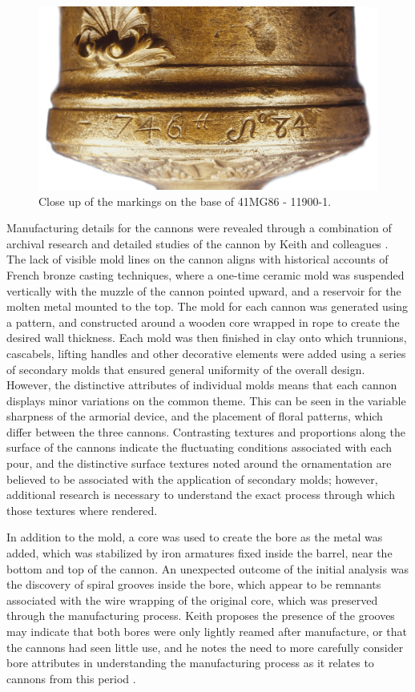 \documentclass[review]{elsarticle}
\begin{document}
\begin{figure}[ht]\centering
\includegraphics[width=\linewidth]{FigBASE2}
\caption{Close up of the markings on the base of 41MG86 - 11900-1.}
\label{fig:FigBASE}
\end{figure}

Manufacturing details for the cannons were revealed through a combination of archival research and detailed studies of the cannon by Keith and colleagues \citep[359-367]{RN5763}. The lack of visible mold lines on the cannon aligns with historical accounts of French bronze casting techniques, where a one-time ceramic mold was suspended vertically with the muzzle of the cannon pointed upward, and a reservoir for the molten metal mounted to the top. The mold for each cannon was generated using a pattern, and constructed around a wooden core wrapped in rope to create the desired wall thickness. Each mold was then finished in clay onto which trunnions, cascabels, lifting handles and other decorative elements were added using a series of secondary molds that ensured general uniformity of the overall design. However, the distinctive attributes of individual molds means that each cannon displays minor variations on the common theme. This can be seen in the variable sharpness of the armorial device, and the placement of floral patterns, which differ between the three cannons. Contrasting textures and proportions along the surface of the cannons indicate the fluctuating conditions associated with each pour, and the distinctive surface textures noted around the ornamentation are believed to be associated with the application of secondary molds; however, additional research is necessary to understand the exact process through which those textures where rendered. 

In addition to the mold, a core was used to create the bore as the metal was added, which was stabilized by iron armatures fixed inside the barrel, near the bottom and top of the cannon. An unexpected outcome of the initial analysis was the discovery of spiral grooves inside the bore, which appear to be remnants associated with the wire wrapping of the original core, which was preserved through the manufacturing process. Keith proposes the presence of the grooves may indicate that both bores were only lightly reamed after manufacture, or that the cannons had seen little use, and he notes the need to more carefully consider bore attributes in understanding the manufacturing process as it relates to cannons from this period \citep[366]{RN5763}.
\end{document}
